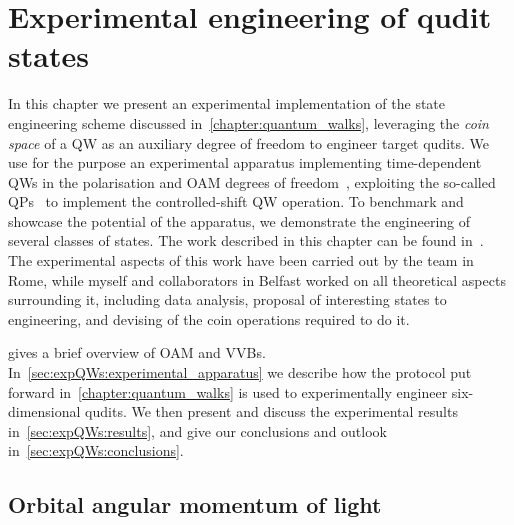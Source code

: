 
\chapter{Experimental engineering of qudit states}
\label{chapter:experimental_engineering_qudits}

In this chapter we present an experimental implementation of the state engineering scheme discussed in~\cref{chapter:quantum_walks}, leveraging the \emph{coin space} of a \ac{QW} as an auxiliary degree of freedom to engineer target qudits.
We use for the purpose an experimental apparatus implementing time-dependent \acp{QW} in the polarisation and \ac{OAM} degrees of freedom~\cite{zhang2010implementation,goyal2013implementing,cardano2015quantum}, exploiting the so-called \acp{QP}~\cite{marrucci2006optical} to implement the controlled-shift QW operation.
To benchmark and showcase the potential of the apparatus, we demonstrate the engineering of several classes of states.
The work described in this chapter can be found in~\cite{giordani2019experimental}.
The experimental aspects of this work have been carried out by the team in Rome, while myself and collaborators in Belfast worked on all theoretical aspects surrounding it, including data analysis, proposal of interesting states to engineering, and devising of the coin operations required to do it.

 gives a brief overview of \ac{OAM} and \acp{VVB}.
In~\cref{sec:expQWs:experimental_apparatus} we describe how the protocol put forward in~\cref{chapter:quantum_walks} is used to experimentally engineer six-dimensional qudits.
We then present and discuss the experimental results in~\cref{sec:expQWs:results}, and give our conclusions and outlook in~\cref{sec:expQWs:conclusions}.


\section{Orbital angular momentum of light}
\label{sec:expQWs:OAMintro}

